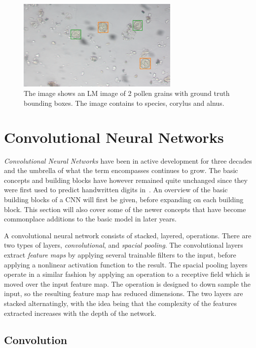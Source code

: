 \begin{figure}[htb]
  \centering
  \includegraphics[width=0.7\textwidth]{figs/background/GT-Snap-080.png}
  \caption[Bounding boxes]{The image shows an LM image of 2 pollen grains with ground truth bounding boxes.
The image contains to species, \textcolor{corylus}{corylus} and \textcolor{alnus}{alnus}.}\label{fig:bbox}
\end{figure}

\section{Convolutional Neural Networks}\label{sec:back-cnn}
\emph{Convolutional Neural Networks} have been in active development for three decades and the umbrella of what the term encompasses continues to grow.
The basic concepts and building blocks have however remained quite unchanged since they were first used to predict handwritten digits in\ \textcite{1989Hdrw}.
An overview of the basic building blocks of a CNN will first be given, before expanding on each building block.
This section will also cover some of the newer concepts that have become commonplace additions to the basic model in later years.

A convolutional neural network consists of stacked, layered, operations.
There are two types of layers, \textit{convolutional}, and \textit{spacial pooling}.
The convolutional layers extract \textit{feature maps} by applying several trainable filters to the input, before applying a nonlinear activation function to the result.
The spacial pooling layers operate in a similar fashion by applying an operation to a receptive field which is moved over the input feature map.
The operation is designed to down sample the input, so the resulting feature map has reduced dimensions.
The two layers are stacked alternatingly, with the idea being that the complexity of the features extracted increases with the depth of the network.

\subsection{Convolution}

